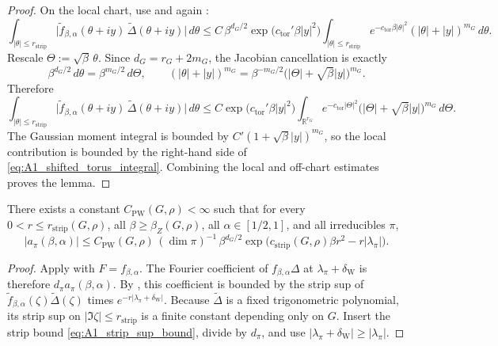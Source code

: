 \begin{proof}
On the local chart, use  and again :
\[
\int_{|\theta|\le r_{\mathrm{strip}}}
\bigl|\widetilde f_{\beta,\alpha}(\theta+iy)\,\widetilde\Delta(\theta+iy)\bigr|\,d\theta
\le
C\,\beta^{d_G/2}
\exp\!\bigl(c_{\mathrm{tor}}'\beta|y|^2\bigr)
\int_{|\theta|\le r_{\mathrm{strip}}} e^{-c_{\mathrm{tor}}\beta|\theta|^2}(|\theta|+|y|)^{m_G}\,d\theta.
\]
Rescale $\Theta:=\sqrt\beta\,\theta$.
Since $d_G=r_G+2m_G$, the Jacobian cancellation is exactly
\[
\beta^{d_G/2}\,d\theta=\beta^{m_G/2}\,d\Theta,
\qquad
(|\theta|+|y|)^{m_G}=\beta^{-m_G/2}\bigl(|\Theta|+\sqrt\beta|y|\bigr)^{m_G}.
\]
Therefore
\[
\int_{|\theta|\le r_{\mathrm{strip}}}
\bigl|\widetilde f_{\beta,\alpha}(\theta+iy)\,\widetilde\Delta(\theta+iy)\bigr|\,d\theta
\le
C\exp\!\bigl(c_{\mathrm{tor}}'\beta|y|^2\bigr)
\int_{\mathbb R^{r_G}} e^{-c_{\mathrm{tor}}|\Theta|^2}\bigl(|\Theta|+\sqrt\beta|y|\bigr)^{m_G}\,d\Theta.
\]
The Gaussian moment integral is bounded by
$C'(1+\sqrt\beta|y|)^{m_G}$, so the local contribution is bounded by the right-hand side of \eqref{eq:A1_shifted_torus_integral}.
Combining the local and off-chart estimates proves the lemma.
\end{proof}

\begin{corollary}\label{cor:A1_a_pi_strip_estimate}
There exists a constant $C_{\mathrm{PW}}(G,\rho)<\infty$ such that for every $0<r\le r_{\mathrm{strip}}(G,\rho)$,
all $\beta\ge \beta_Z(G,\rho)$, all $\alpha\in[1/2,1]$, and all irreducibles $\pi$,
\begin{equation}\label{eq:A1_a_pi_strip_estimate}
|a_\pi(\beta,\alpha)|
\le
C_{\mathrm{PW}}(G,\rho)
\,(\dim\pi)^{-1}\,\beta^{d_G/2}
\exp\!\bigl(c_{\mathrm{strip}}(G,\rho)\beta r^2-r|\lambda_\pi|\bigr).
\end{equation}
\end{corollary}

\begin{proof}
Apply  with $F=f_{\beta,\alpha}$.
The Fourier coefficient of $f_{\beta,\alpha}\Delta$ at $\lambda_\pi+\delta_{\mathrm W}$ is therefore
$d_\pi a_\pi(\beta,\alpha)$.
By , this coefficient is bounded by the strip sup of
$\widetilde f_{\beta,\alpha}(\zeta)\widetilde\Delta(\zeta)$ times $e^{-r|\lambda_\pi+\delta_{\mathrm W}|}$.
Because $\widetilde\Delta$ is a fixed trigonometric polynomial, its strip sup on $|\Im\zeta|\le r_{\mathrm{strip}}$ is a finite constant depending only on $G$.
Insert the strip bound \eqref{eq:A1_strip_sup_bound}, divide by $d_\pi$, and use $|\lambda_\pi+\delta_{\mathrm W}|\ge |\lambda_\pi|$.
\end{proof}

